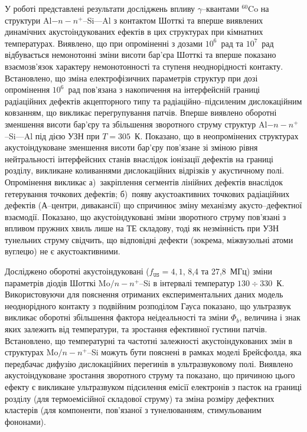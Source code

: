 У  роботі представлені результати досліджень
впливу $\gamma$--квантами $^{60}$Co на структури Al$-n-n^+$--Si---Al з контактом Шотткі та
вперше виявлених динамічних акустоіндукованих ефектів в цих структурах при кімнатних температурах.
Виявлено, що при
опроміненні  з дозами $10^6$~рад та $10^7$~рад відбувається
немонотонні зміни висоти бар'єра Шотткі та вперше показано взаємозв'язок характеру немонотонності та ступеня неоднорідності контакту.
Встановлено, що зміна електрофізичних параметрів структур при дозі опромінення $10^6$~рад
пов'язана з накопичення на інтерфейсній границі радіаційних дефектів акцепторного типу та радіаційно--підсиленим дислокаційним ковзанням, що викликає перегрупування патчів.
Вперше виявлено оборотні зменшення висоти бар'єру та збільшення зворотного струму  структур Al$-n-n^+$--Si---Al під дією УЗН при $T=305$~К.
Показано, що в неопромінених структурах акустоіндуковане зменшення висоти бар'єру пов'язане зі зміною рівня нейтральності інтерфейсних станів
внаслідок іонізації дефектів на границі розділу, викликане коливаннями дислокаційних відрізків у акустичному полі.
Опромінення викликає
а)~закріплення сегментів лінійних дефектів внаслідок гетерування точкових дефектів;
б)~появу акустоактивних точкових радіаційних дефектів (А--центри, дивакансії)
що спричинює зміну механізму акусто--дефектної взаємодії.
Показано, що акустоіндуковані зміни зворотного струму пов'язані з впливом пружних хвиль лише на ТЕ складову,
тоді як незмінність при УЗН тунельних струму свідчить, що відповідні дефекти (зокрема, міжвузольні атоми вуглецю) не є акустоактивними.


Досліджено оборотні акустоіндуковані ($f_\mathtt{US}=4,1$, 8,4 та 27,8~МГц) зміни параметрів діодів Шотткі Mo$/n-n^+$--Si в інтервалі температур $130\div330$~К.
Використовуючи для пояснення отриманих експериментальних даних модель неоднорідного контакту з подвійним розподілом Гауса
показано, що ультразвук викликає оборотні збільшення фактора неідеальності та зміни $\Phi_{b}$,
величина і знак яких залежить від температури,
та зростання ефективної густини патчів.
Встановлено, що температурні та частотні залежності акустоіндукованих змін в структурах
 Mo$/n-n^+$--Si  можуть бути пояснені в рамках моделі Брейсфолда,
яка передбачає дифузію дислокаційних перегинів в ультразвуковому полі.
Виявлено акустоіндуковане зростання зворотного струму та показано, що причиною цього ефекту є викликане ультразвуком підсилення емісії електронів з пасток на границі розділу (для термоемісійної складової струму) та зміна розміру дефектних кластерів (для компоненти, пов'язаної з тунелюванням, стимульованим фононами).

